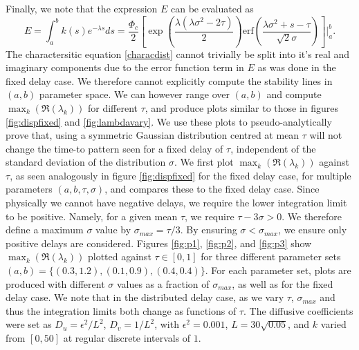 Finally, we note that the expression $E$ can be evaluated as
\begin{equation}
E=\int_a^bk(s)e^{-\lambda s}ds=\frac{\Phi_c}{2}\left[\exp\left(\frac{\lambda(\lambda\sigma^2-2\tau)}{2}\right) \text{erf} \left(\frac{\lambda\sigma^2+s-\tau}{\sqrt{2}\sigma}\right)\right]\Bigg|_a^b.
\end{equation}
The charactersitic equation \eqref{characdist} cannot trivially be split into it's real and imaginary components due to the error function term in $E$ as was done in the fixed delay case. We therefore cannot explicitly compute the stability lines in $(a,b)$ parameter space. We can however range over $(a,b)$ and compute $\max_k(\Re(\lambda_k))$ for different $\tau$, and produce plots similar to those in figures \ref{fig:dispfixed} and \ref{fig:lambdavary}. We use these plots to pseudo-analytically prove that, using a symmetric Gaussian distribution centred at mean $\tau$ will not change the time-to pattern seen for a fixed delay of $\tau$, independent of the standard deviation of the distribution $\sigma$. We first plot $\max_k(\Re(\lambda_k))$ against $\tau$, as seen analogously in figure \ref{fig:dispfixed} for the fixed delay case, for multiple parameters $(a,b,\tau,\sigma)$, and compares these to the fixed delay case. Since physically we cannot have negative delays, we require the lower integration limit to be positive. Namely, for a given mean $\tau$, we require $\tau-3\sigma>0$. We therefore define a maximum $\sigma$ value by $\sigma_{max}=\tau / 3$. By ensuring $\sigma<\sigma_{max}$, we ensure only positive delays are considered. Figures \ref{fig:p1}, \ref{fig:p2}, and \ref{fig:p3} show $\max_k(\Re(\lambda_k))$ plotted against $\tau\in[0,1]$ for three different parameter sets $(a,b)=\{(0.3,1.2), (0.1,0.9), (0.4,0.4)\}$. For each parameter set, plots are produced with different $\sigma$ values as a fraction of $\sigma_{max}$, as well as for the fixed delay case. We note that in the distributed delay case, as we vary $\tau$, $\sigma_{max}$ and thus the integration limits both change as functions of $\tau$. The diffusive coefficients were set as $D_u=\epsilon^2/L^2$, $D_v=1/L^2$,  with  $\epsilon^2=0.001$, $L=30\sqrt{0.05}$, and $k$ varied from $[0,50]$ at regular discrete intervals of $1$.

